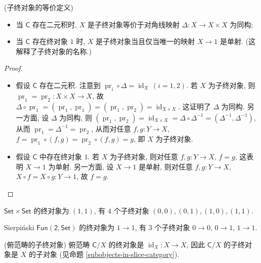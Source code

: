 \begin{prop}
	{(子终对象的等价定义)}
	\begin{itemize}
		\item 当 $\mathsf C$ 存在二元积时, $X$ 是子终对象等价于对角线映射 $\Delta\colon X\to X\times X$ 为同构;
		\item 当 $\mathsf C$ 存在终对象 $1$ 时, $X$ 是子终对象当且仅当唯一的映射 $X\to 1$ 是单射. (这解释了子终对象的名称.)
	\end{itemize}
\end{prop}

\begin{proof}
	~\\
	\begin{itemize}
		\item 假设 $\mathsf C$ 存在二元积. 注意到 $\operatorname{pr}_i\circ\Delta=\operatorname{id}_X\,(i=1,2)$.
		若 $X$ 为子终对象, 则
		$\operatorname{pr}_1=\operatorname{pr}_2\colon X\times X\to X$,
		故 $\Delta\circ \operatorname{pr}_1 = (\operatorname{pr}_1,\operatorname{pr}_1)= (\operatorname{pr}_1,\operatorname{pr}_2) = \operatorname{id}_{X\times X}$. 这证明了 $\Delta$ 为同构.
		另一方面, 设 $\Delta$ 为同构,
		则 $(\operatorname{pr}_1,\operatorname{pr}_2)=\operatorname{id}_{X\times X} = \Delta\circ\Delta^{-1} = (\Delta^{-1},\Delta^{-1})$, 从而 $\operatorname{pr}_1=\Delta^{-1}=\operatorname{pr}_2$,
		从而对任意 $f,g\colon Y\to X$,
		$f=\operatorname{pr}_1\circ (f,g)=\operatorname{pr}_2\circ (f,g)=g$, 即 $X$ 为子终对象.
		\item 假设 $\mathsf C$ 中存在终对象 $1$.
		若 $X$ 为子终对象, 则对任意 $f,g\colon Y\to X$, $f=g$, 这表明 $X\to 1$ 为单射.
		另一方面, 设 $X\to 1$ 是单射, 则对任意 $f,g\colon Y\to X$, $X\circ f=X\circ g\colon Y\to 1$, 故 $f=g$.
	\end{itemize}
\end{proof}

\begin{example}
	{}
	$\mathsf {Set}\times\mathsf {Set}$ 的终对象为 $(1,1)$, 有 $4$ 个子终对象 $(0,0),(0,1),(1,0),(1,1)$.
	
	Sierpi\'nski\topos{} $\mathsf {Fun}(\mathsf 2,\mathsf {Set})$ 的终对象为 $1\to 1$, 有 $3$ 个子终对象 $0\to 0$, $0\to 1$, $1\to 1$.
\end{example}

\begin{example}
	[label={subterminal-of-slice-category}]
	{(俯范畴的子终对象)}
	俯范畴 $\mathsf C/X$ 的终对象是 $\operatorname{id}_X\colon X\to X$, 因此 $\mathsf C/X$ 的子终对象是 $X$ 的子对象 (见命题 \ref{subobjects-in-slice-category}).
\end{example}


